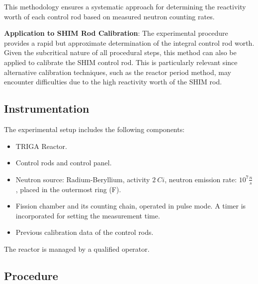 This methodology ensures a systematic approach for determining the reactivity worth of each control rod based on measured neutron counting rates.


\begin{tcolorbox}[boxstyle2]
    \textbf{Application to SHIM Rod Calibration}:
    The experimental procedure provides a rapid but approximate determination of the integral control rod worth. Given the subcritical nature of all procedural steps, this method can also be applied to calibrate the SHIM control rod. This is particularly relevant since alternative calibration techniques, such as the reactor period method, may encounter difficulties due to the high reactivity worth of the SHIM rod.
\end{tcolorbox}


\subsection{Instrumentation}

The experimental setup includes the following components:

\begin{itemize}
    \item TRIGA Reactor.
    \item Control rods and control panel.
    \item Neutron source: Radium-Beryllium, activity $2~Ci$, neutron emission rate: $10^7 \frac{n}{s}$, placed in the outermost ring (F).
    \item Fission chamber and its counting chain, operated in pulse mode. A timer is incorporated for setting the measurement time.
    \item Previous calibration data of the control rods.
\end{itemize}

The reactor is managed by a qualified operator.

\subsection{Procedure}

